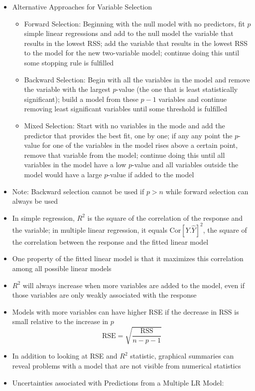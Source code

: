 \documentclass[12pt]{article}
\begin{document}
\begin{itemize}
\item Alternative Approaches for Variable Selection \begin{itemize} 
\item Forward Selection: Beginning with the null model with no predictors, fit $p$ simple linear regressions and add to the null model the variable that results in the lowest RSS; add the variable that results in the lowest RSS to the model for the new two-variable model; continue doing this until some stopping rule is fulfilled 
\item Backward Selection: Begin with all the variables in the model and remove the variable with the largest $p$-value (the one that is least statistically significant); build a model from these $p-1$ variables and continue removing least significant variables until some threshold is fulfilled 
\item Mixed Selection: Start with no variables in the mode and add the predictor that provides the best fit, one by one; if any any point the $p$-value for one of the variables in the model rises above a certain point, remove that variable from the model; continue doing this until all variables in the model have a low $p$-value and all variables outside the model would have a large $p$-value if added to the model \end{itemize} 
\item Note: Backward selection cannot be used if $p > n$ while forward selection can always be used 
\item In simple regression, $R^2$ is the square of the correlation of the response and the variable; in multiple linear regression, it equals $\text{Cor}[Y. \hat{Y}]^2$, the square of the correlation between the response and the fitted linear model 
\item One property of the fitted linear model is that it maximizes this correlation among all possible linear models 
\item $R^2$ will always increase when more variables are added to the model, even if those variables are only weakly associated with the response
\item Models with more variables can have higher RSE if the decrease in RSS is small relative to the increase in $p$ $$ \text{RSE} = \sqrt{\frac{\text{RSS}}{n-p-1}} $$ 
\item In addition to looking at RSE and $R^2$ statistic, graphical summaries can reveal problems with a model that are not visible from numerical statistics 
\item Uncertainties associated with Predictions from a Multiple LR Model: \begin{itemize} 

\end{itemize}
\end{itemize}
\end{document}
